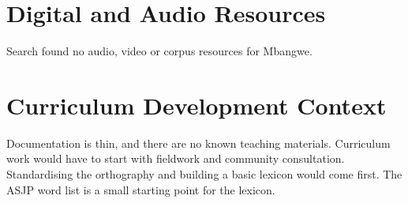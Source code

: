 \documentclass[12pt]{article}
\begin{document}
\section{Digital and Audio Resources}
Search found no audio, video or corpus resources for Mbangwe.

\section{Curriculum Development Context}
Documentation is thin, and there are no known teaching materials. Curriculum work would have to start with fieldwork and community consultation. Standardising the orthography and building a basic lexicon would come first. The ASJP word list is a small starting point for the lexicon.
\end{document}
